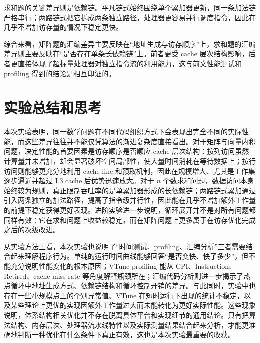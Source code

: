 ﻿\documentclass[UTF8,a4paper,12pt]{ctexart}
\begin{document}
求和题的关键差异则是依赖链。平凡链式始终围绕单个累加器更新，同一条加法链严格串行；两路链式把它拆成两条独立路径，处理器更容易并行调度指令，因此在几乎不增加访存量的情况下稳定更快。

\noindent 综合来看，矩阵题的汇编差异主要反映在“地址生成与访存顺序”上，求和题的汇编差异则主要反映在“是否存在单条长依赖链”上。前者更受 cache 层次结构影响，后者更直接体现了超标量处理器对独立指令流的利用能力，这与前文性能测试和 profiling 得到的结论是相互印证的。

\section{实验总结和思考}
本次实验表明，同一数学问题在不同代码组织方式下会表现出完全不同的实际性能，而这些差异往往并不能仅凭算法的渐进复杂度直接看出。对于矩阵与向量内积问题，决定性能的首要因素是访存顺序是否顺应 cache 层次结构：按列访问虽然计算量并未增加，却会显著破坏空间局部性，使大量时间消耗在等待数据上；按行访问则能够更充分地利用 cache line 和预取机制，因此在规模增大、尤其是工作集逐步逼近并超过 L3 cache 后优势迅速放大。对于 \(n\) 个数求和问题，数据访问本身始终较为规则，真正限制吞吐率的是单累加器形成的长依赖链；两路链式累加通过引入两条独立的加法路径，提高了指令级并行性，因此能在几乎不增加额外工作量的前提下稳定获得更好表现。进阶实验进一步说明，循环展开并不是对所有问题都同样有效：它在求和问题上收益较稳定，而在矩阵问题上更多属于在访存优化完成之后的次级改进。

从实验方法上看，本次实验也说明了“时间测试、profiling、汇编分析”三者需要结合起来理解程序行为。单纯的运行时间曲线能够回答“是否变快、快了多少”，但不能充分说明性能变化的根本原因；VTune profiling 能从 CPI、Instructions Retired、cache miss rate 等角度解释瓶颈所在；汇编代码分析则进一步揭示了热点循环中地址生成方式、依赖链结构和循环控制开销的差异。与此同时，实验中也存在一些小规模点上的个别异常值、VTune 在短时运行下出现的统计不稳定，以及某些理论上更优的实现因额外工作量过大而未能转化为更好实际性能。这些现象说明，体系结构相关优化并不存在脱离具体平台和实现细节的通用结论。只有把算法结构、内存层次、处理器流水线特性以及实际测量结果结合起来分析，才能更准确地判断一种优化在什么条件下真正有效，这也是本次实验最重要的收获。
\end{document}
